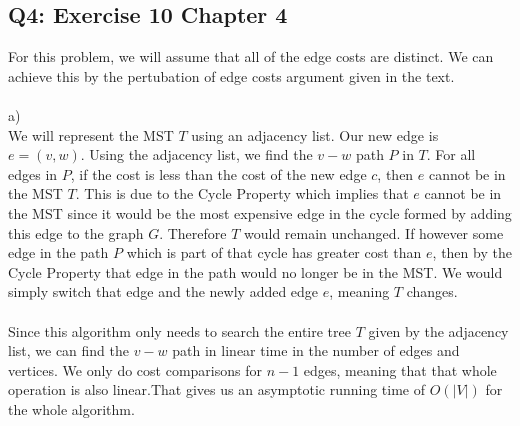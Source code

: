 \documentclass[12pt, oneside]{article}
\begin{document}
\subsection*{Q4: Exercise 10 Chapter 4}
For this problem, we will assume that all of the edge costs are distinct. We can achieve this by the pertubation of edge costs argument given in the text.\\\\
a)\\
We will represent the MST $T$ using an adjacency list. Our new edge is $e= (v,w)$. Using the adjacency list, we find the $v-w$ path $P$ in $T$. For all edges in $P$, if the cost is less than the cost of the new edge $c$, then $e$ cannot be in the MST $T$. This is due to the Cycle Property which implies that $e$ cannot be in the MST since it would be the most expensive edge in the cycle formed by adding this edge to the graph $G$. Therefore $T$ would remain unchanged. If however some edge in the path $P$ which is part of that cycle has greater cost than $e$, then by the Cycle Property that edge in the path would no longer be in the MST. We would simply switch that edge and the newly added edge $e$, meaning $T$ changes.\\\\
Since this algorithm only needs to search the entire tree $T$ given by the adjacency list, we can find the $v-w$ path in linear time in the number of edges and vertices. We only do cost comparisons for $n-1$ edges, meaning that that whole operation is also linear.That gives us an asymptotic running time of $O(|V|)$ for the whole algorithm.
\end{document}

